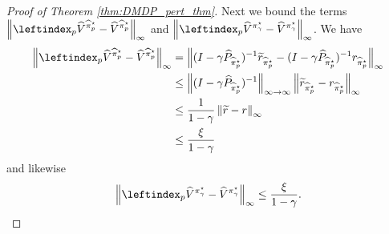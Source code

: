 \documentclass{article}
\theoremstyle{plain}
\theoremstyle{plain}
\theoremstyle{remark}
\theoremstyle{plain}
\theoremstyle{plain}
\newcommand{\Phat}{\widehat{P}}
\newcommand{\Vhat}{\widehat{V}}
\newcommand{\pistar}{\pi^\star}
\newcommand{\pihat}{\widehat{\pi}}
\newcommand{\Vhatpert}{\leftindex_p{\Vhat}}
\newcommand{\pihatpert}{\pihat^\star_p}
\begin{document}
\begin{proof}[Proof of Theorem \ref{thm:DMDP_pert_thm}]
    Next we bound the terms $\infnorm{\Vhatpert^{\pihatpert} - \Vhat^{\pihatpert}}$ and $\infnorm{\Vhatpert^{\pistar_\gamma} - \Vhat^{\pistar_\gamma}}$. We have
    \begin{align}
        \infnorm{\Vhatpert^{\pihatpert} - \Vhat^{\pihatpert}} &= \infnorm{(I - \gamma \Phat_{\pihatpert})^{-1} \widetilde{r}_{\pihatpert} - (I - \gamma \Phat_{\pihatpert})^{-1} r_{\pihatpert}} \nonumber\\
        & \leq \infinfnorm{(I - \gamma \Phat_{\pihatpert})^{-1}} \infnorm{\widetilde{r}_{\pihatpert} - r_{\pihatpert}} \nonumber\\
        & \leq \frac{1}{1-\gamma} \infnorm{\widetilde{r} - r} \nonumber \\
        & \leq \frac{\xi}{1-\gamma} \label{eq:pert_error_bound_1}
    \end{align}
    and likewise
    \begin{align}
        \infnorm{\Vhatpert^{\pistar_\gamma} - \Vhat^{\pistar_\gamma}} \leq \frac{\xi}{1-\gamma}. \label{eq:pert_error_bound_2}
    \end{align}


\end{proof}
\end{document}
